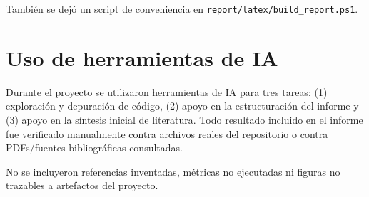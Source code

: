 Tambi\'en se dej\'o un script de conveniencia en \texttt{report/latex/build\_report.ps1}.

\section{Uso de herramientas de IA}

Durante el proyecto se utilizaron herramientas de IA para tres tareas: (1) exploraci\'on y depuraci\'on de c\'odigo, (2) apoyo en la estructuraci\'on del informe y (3) apoyo en la s\'intesis inicial de literatura. Todo resultado incluido en el informe fue verificado manualmente contra archivos reales del repositorio o contra PDFs/fuentes bibliogr\'aficas consultadas.

\begin{table}[h]
\centering
\caption{Uso declarado de herramientas de IA.}
\label{tab:ai_use}
\end{table}

No se incluyeron referencias inventadas, m\'etricas no ejecutadas ni figuras no trazables a artefactos del proyecto.
